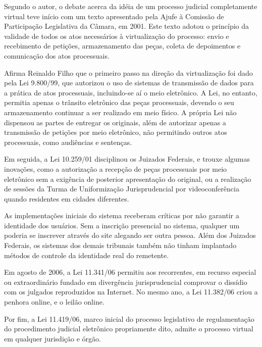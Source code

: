 	Segundo o autor, o debate acerca da idéia de um processo
  judicial completamente virtual teve início com um texto
  apresentado pela Ajufe à Comissão de Participação Legislativa
  da Câmara, em 2001. Este texto adotou o princípio da validade
  de todos os atos necessários à virtualização do processo: envio
  e recebimento de petições, armazenamento das peças, coleta de
  depoimentos e comunicação dos atos processuais.\par
	
	Afirma Reinaldo Filho que o primeiro passo na direção da
  virtualização foi dado pela Lei 9.800/99, que autorizou o uso
  de sistemas de transmissão de dados para a prática de atos
  processuais, incluindo-se aí o meio eletrônico. A Lei, no
  entanto, permitia apenas o trânsito eletrônico das peças
  processuais, devendo o seu armazenamento continuar a ser
  realizado em meio físico. A própria Lei não dispensou as partes
  de entregar os originais, além de autorizar apenas a
  transmissão de petições por meio eletrônico, não permitindo
  outros atos processuais, como audiências e sentenças.\par
	
	Em seguida, a Lei 10.259/01 disciplinou os Juizados Federais, e
  trouxe algumas inovações, como a autorização a recepção de
  peças processuais por meio eletrônico sem a exigência de
  posterior apresentação do original, ou a realização de sessões
  da Turma de Uniformização Jurisprudencial por videoconferência
  quando residentes em cidades diferentes. \par
	
	As implementações iniciais do sistema receberam críticas por
  não garantir a identidade dos usuários. Sem a inscrição
  presencial no sistema, qualquer um poderia se inscrever através
  do site alegando ser outra pessoa. Além dos Juizados Federais,
  os sistemas dos demais tribunais também não tinham
  implantado métodos de controle da identidade real do
  remetente.\par
	
	Em agosto de 2006, a Lei 11.341/06 permitiu aos recorrentes, em
  recurso especial ou extraordinário fundado em divergência
  jurisprudencial comprovar o dissídio com os julgados
  reproduzidos na Internet. No mesmo ano, a Lei 11.382/06 criou a
  penhora online, e o leilão online. \par
	
	Por fim, a Lei 11.419/06, marco inicial do processo legislativo
  de regulamentação do procedimento judicial eletrônico
  propriamente dito, admite o processo virtual em qualquer
  jurisdição e órgão. \par
